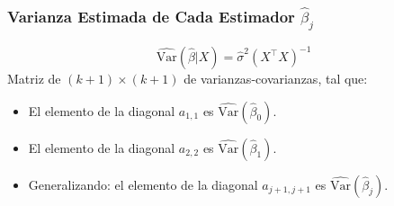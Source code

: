 \documentclass{beamer}
\begin{document}
 \begin{frame}
\frametitle{Varianza Estimada de Cada Estimador $\hat{\beta}_j$}

\[
\hat{\text{Var}}(\hat{\beta}|X) = \hat{\sigma}^2(X^{\top}X)^{-1}
\]
Matriz de $(k + 1) \times (k + 1)$ de varianzas-covarianzas, tal que:
\begin{itemize}
    \item El elemento de la diagonal $a_{1,1}$ es $\hat{\text{Var}}(\hat{\beta}_0)$.
    \item El elemento de la diagonal $a_{2,2}$ es $\hat{\text{Var}}(\hat{\beta}_1)$.
    \item Generalizando: el elemento de la diagonal $a_{j+1,j+1}$ es $\hat{\text{Var}}(\hat{\beta}_j)$.
\end{itemize}
\end{frame}

\end{document}
